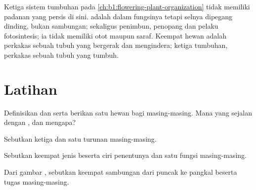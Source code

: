 \begin{remark}\label{rem:b1:body-plans-tissues:plants}
Ketiga sistem  tumbuhan pada
\cref{ch:b1:flowering-plant-organization} tidak memiliki padanan yang
persis di sini.  adalah  dalam fungsinya tetapi selnya
dipegang dinding, bukan sambungan;  sekaligus penimbun,
penopang dan pelaku fotosintesis; ia tidak memiliki otot maupun saraf.
Keempat  hewan adalah perkakas sebuah tubuh yang bergerak dan
mengindera; ketiga  tumbuhan, perkakas sebuah tubuh yang tumbuh.
\end{remark}

\section{Latihan}

\begin{exercise}[$\star$]\label{exo:b1:body-plans-tissues:1}
Definisikan  dan  serta berikan satu
hewan bagi masing-masing. Mana yang sejalan dengan , dan
mengapa?
\end{exercise}

\begin{exercise}[$\star$]\label{exo:b1:body-plans-tissues:2}
Sebutkan ketiga  dan satu  turunan masing-masing.
\end{exercise}

\begin{exercise}[$\star$]\label{exo:b1:body-plans-tissues:3}
Sebutkan keempat jenis  beserta ciri penentunya dan satu fungsi
masing-masing.
\end{exercise}

\begin{exercise}[$\star$]\label{exo:b1:body-plans-tissues:4}
Dari gambar , sebutkan keempat sambungan dari puncak ke pangkal
beserta tugas masing-masing.
\end{exercise}

